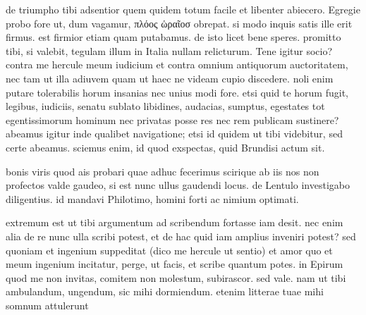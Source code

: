  de triumpho tibi adsentior quem quidem totum facile et libenter abiecero. Egregie probo fore ut, dum vagamur, πλόος ὡραῖοσ obrepat. si modo inquis satis ille erit firmus. est firmior etiam quam putabamus. de isto licet bene speres. promitto tibi, si valebit, tegulam illum in Italia nullam relicturum. Tene igitur socio? contra me hercule meum iudicium et contra omnium antiquorum auctoritatem, nec tam ut illa adiuvem quam ut haec ne videam cupio discedere. noli enim putare tolerabilis horum insanias nec unius modi fore. etsi quid te horum fugit, legibus, iudiciis, senatu sublato libidines, audacias, sumptus, egestates tot egentissimorum hominum nec privatas posse res nec rem publicam sustinere? abeamus igitur inde qualibet navigatione; etsi id quidem ut tibi videbitur, sed certe abeamus. sciemus enim, id quod exspectas, quid Brundisi actum sit.

 bonis viris quod ais probari quae adhuc fecerimus scirique ab iis nos non profectos valde gaudeo, si est nunc ullus gaudendi locus. de Lentulo investigabo diligentius. id mandavi Philotimo, homini forti ac nimium optimati.

 extremum est ut tibi argumentum ad scribendum fortasse iam desit. nec enim alia de re nunc ulla scribi potest, et de hac quid iam amplius inveniri potest? sed quoniam et ingenium suppeditat (dico me hercule ut sentio) et amor quo et meum ingenium incitatur, perge, ut facis, et scribe quantum potes. in Epirum quod me non invitas, comitem non molestum, subirascor. sed vale. nam ut tibi ambulandum, ungendum, sic mihi dormiendum. etenim litterae tuae mihi somnum attulerunt
